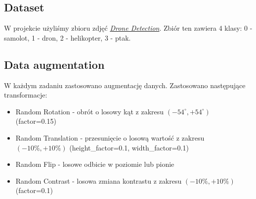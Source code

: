 \subsection{Dataset}
W projekcie użyliśmy zbioru zdjęć \href{https://www.kaggle.com/datasets/cybersimar08/drone-detection}{\textit{Drone Detection}}. Zbiór ten zawiera 4 klasy: 0 - samolot, 1 - dron, 2 - helikopter, 3 - ptak.

\subsection{Data augmentation}

W każdym zadaniu zastosowano augmentację danych. Zastosowano następujące transformacje:
\begin{itemize}
    \item Random Rotation - obrót o losowy kąt z zakresu $(-54^{\circ} , +54^{\circ})$ (factor=0.15)
    \item Random Translation - przesunięcie o losową wartość z zakresu $(-10\%, +10\%)$ (height\_factor=0.1, width\_factor=0.1)
    \item Random Flip - losowe odbicie w poziomie lub pionie
    \item Random Contrast - losowa zmiana kontrastu z zakresu $(-10\%, +10\%)$ (factor=0.1)
\end{itemize}
